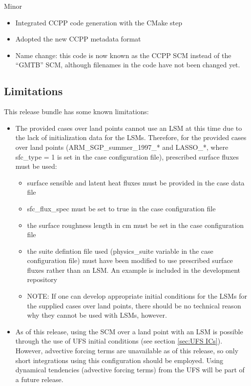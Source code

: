 Minor
\begin{itemize}
\item Integrated CCPP code generation with the CMake step
\item Adopted the new CCPP metadata format
\item Name change: this code is now known as the CCPP SCM instead of the ``GMTB'' SCM, although filenames in the code have not been changed yet.
\end{itemize}

\subsection{Limitations}

This release bundle has some known limitations:

\begin{itemize}
\item The provided cases over land points cannot use an LSM at this time due to the lack of initialization data for the LSMs. Therefore, for the provided cases over land points (ARM\_SGP\_summer\_1997\_* and LASSO\_*, where sfc\_type = 1 is set in the case configuration file), prescribed surface fluxes must be used:
\begin{itemize}
\item surface sensible and latent heat fluxes must be provided in the case data file
\item sfc\_flux\_spec must be set to true in the case configuration file
\item the surface roughness length in cm must be set in the case configuration file
\item the suite defintion file used (physics\_suite variable in the case configuration file) must have been modified to use prescribed surface fluxes rather than an LSM. An example is included in the development repository
\item NOTE: If one can develop appropriate initial conditions for the LSMs for the supplied cases over land points, there should be no technical reason why they cannot be used with LSMs, however.
\end{itemize}
\item As of this release, using the SCM over a land point with an LSM is possible through the use of UFS initial conditions (see section \ref{sec:UFS ICs}). However, advective forcing terms are unavailable as of this release, so only short integrations using this configuration should be employed. Using dynamical tendencies (advective forcing terms) from the UFS will be part of a future release.
\end{itemize}
